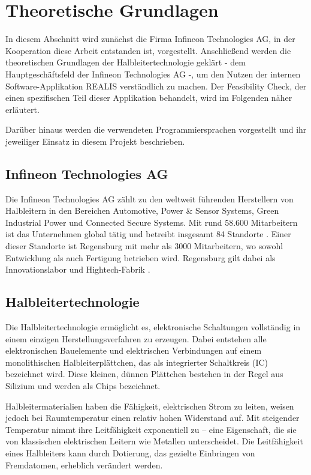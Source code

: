 \chapter{Theoretische Grundlagen}\label{Chap:TheoretischeGrundlagen}
In diesem Abschnitt wird zunächst die Firma Infineon Technologies AG, in der Kooperation diese Arbeit entstanden ist, vorgestellt. Anschließend werden die theoretischen Grundlagen der Halbleitertechnologie geklärt - dem Hauptgeschäftsfeld der Infineon Technologies AG -, um den Nutzen der internen Software-Applikation \ac{REALIS} verständlich zu machen. Der Feasibility Check, der einen spezifischen Teil dieser Applikation behandelt, wird im Folgenden näher erläutert.

Darüber hinaus werden die verwendeten Programmiersprachen vorgestellt und ihr jeweiliger Einsatz in diesem Projekt beschrieben.

\section{Infineon Technologies AG}

Die Infineon Technologies AG zählt zu den weltweit führenden Herstellern von Halbleitern in den Bereichen Automotive, Power \& Sensor Systems, Green Industrial Power und Connected Secure Systems. Mit rund 58.600 Mitarbeitern ist das Unternehmen global tätig und betreibt insgesamt 84 Standorte \cite{infineon2024unternehmenspraesentation}. Einer dieser Standorte ist Regensburg mit mehr als 3000 Mitarbeitern, wo sowohl Entwicklung als auch Fertigung betrieben wird. Regensburg gilt dabei als Innovationslabor und Hightech-Fabrik \cite{infineon2024regensburg}.


\section{Halbleitertechnologie}

Die Halbleitertechnologie ermöglicht es, elektronische Schaltungen vollständig in einem einzigen Herstellungsverfahren zu erzeugen. Dabei entstehen alle elektronischen Bauelemente und elektrischen Verbindungen auf einem monolithischen Halbleiterplättchen, das als integrierter Schaltkreis (\ac{IC}) bezeichnet wird. Diese kleinen, dünnen Plättchen bestehen in der Regel aus Silizium und werden als Chips bezeichnet.

Halbleitermaterialien haben die Fähigkeit, elektrischen Strom zu leiten, weisen jedoch bei Raumtemperatur einen relativ hohen Widerstand auf. Mit steigender Temperatur nimmt ihre Leitfähigkeit exponentiell zu – eine Eigenschaft, die sie von klassischen elektrischen Leitern wie Metallen unterscheidet. Die Leitfähigkeit eines Halbleiters kann durch Dotierung, das gezielte Einbringen von Fremdatomen, erheblich verändert werden.

